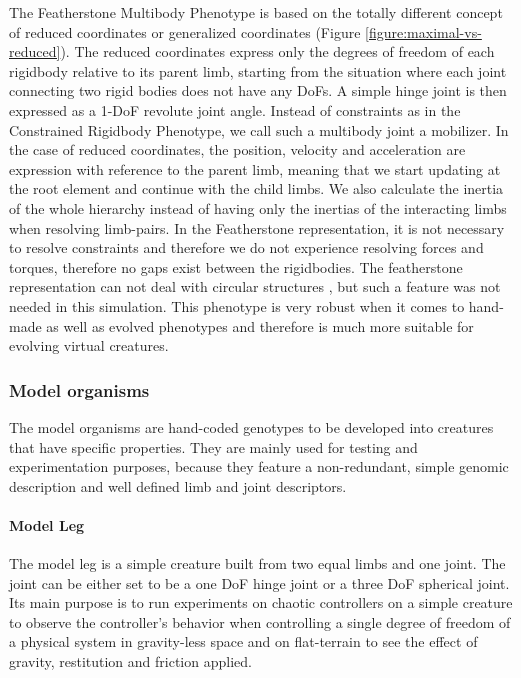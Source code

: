 \documentclass[main]{subfiles}
\begin{document}
The Featherstone Multibody Phenotype is based on the totally different concept of reduced coordinates or generalized coordinates (Figure \ref{figure:maximal-vs-reduced}). The reduced coordinates express only the degrees of freedom of each rigidbody relative to its parent limb, starting from the situation where each joint connecting two rigid bodies does not have any DoFs. A simple hinge joint is then expressed as a 1-DoF revolute joint angle. Instead of constraints as in the Constrained Rigidbody Phenotype, we call such a multibody joint a mobilizer. In the case of reduced coordinates, the position, velocity and acceleration are expression with reference to the parent limb, meaning that we start updating at the root element and continue with the child limbs. We also calculate the inertia of the whole hierarchy instead of having only the inertias of the interacting limbs when resolving limb-pairs. In the Featherstone representation, it is not necessary to resolve constraints and therefore we do not experience resolving forces and torques, therefore no gaps exist between the rigidbodies. The featherstone representation can not deal with circular structures \cite{bib::Coumans2014}, but such a feature was not needed in this simulation. This phenotype is very robust when it comes to hand-made as well as evolved phenotypes and therefore is much more suitable for evolving virtual creatures. 

\subsubsection{Model organisms}

The model organisms are hand-coded genotypes to be developed into creatures that have specific properties. They are mainly used for testing and experimentation purposes, because they feature a non-redundant, simple genomic description and well defined limb and joint descriptors.

\paragraph{Model Leg}

The model leg is a simple creature built from two equal limbs and one joint. The joint can be either set to be a one DoF hinge joint or a three DoF spherical joint. Its main purpose is to run experiments on chaotic controllers on a simple creature to observe the controller's behavior when controlling a single degree of freedom of a physical system in gravity-less space and on flat-terrain to see the effect of gravity, restitution and friction applied.
\end{document}
